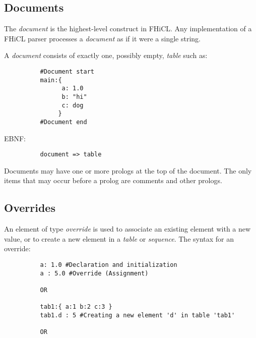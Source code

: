 \documentclass{memarticle}
\begin{document}
{                \subsection{Documents}
                        The \emph{document} is the highest-level construct 
                        in FHiCL.
                        Any implementation of a FHiCL parser
                        processes a \emph{document}
                        as if it were a single string.

                        A \emph{document} consists of exactly one,
                        possibly empty,
                        \emph{table} such as:
                        \begin{verbatim}
          #Document start
          main:{
                a: 1.0
                b: "hi"
                c: dog
               }
          #Document end
                        \end{verbatim}  
                        EBNF:
                        \begin{verbatim}
          document => table
                        \end{verbatim}
                        \par
                        Documents may have one or more prologs at the top of the document.
                        The only items that may occur before a prolog are comments and other prologs.
                        
                \subsection{Overrides}
                        An element of type \emph{override} is used to associate 
                        an existing element with a new value,
                        or to create a new element in a \emph{table} or \emph{sequence}.
                        The syntax for an override:
                        \begin{verbatim}
          a: 1.0 #Declaration and initialization
          a : 5.0 #Override (Assignment)
                                
          OR
                                
          tab1:{ a:1 b:2 c:3 }
          tab1.d : 5 #Creating a new element 'd' in table 'tab1'
                                
          OR
                                

\end{verbatim}}
\end{document}
